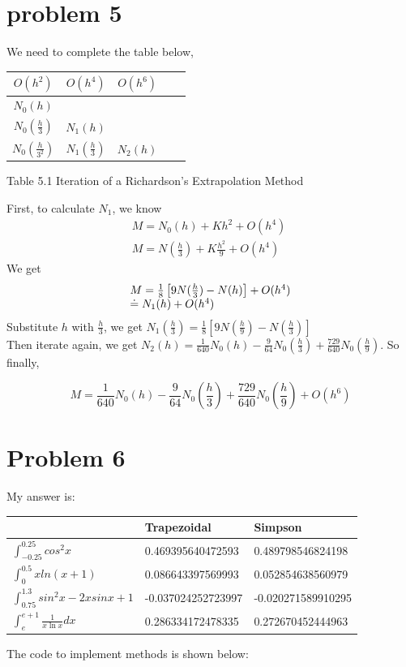 \documentclass{article}
\begin{document}
\section{problem 5}
We need to complete the table below,
\begin{center}
\begin{tabular}{ccccc} \hline
$O(h^2)$ & $O(h^4)$ &$O(h^6)$ \\
\hline
$N_0(h)$         		  &    								   & 										\\
$N_0(\frac{h}{3})$  & $N_1(h)$    				 &  									\\
$N_0(\frac{h}{3^2})$	& $N_1(\frac{h}{3})$   & $N_2(h)$  					\\
 \hline
\end{tabular}
\end{center}
\begin{center}
Table 5.1 Iteration of a Richardson's Extrapolation Method
\end{center}
First, to calculate $N_1$, we know
\begin{equation}
\begin{array}{c}
M = {N_0}(h) + K{h^2} + O({h^4})\;\\
M = N(\frac{h}{3}) + K\frac{{{h^2}}}{9} + O({h^4})
\end{array}
\end{equation}
We get
\[\begin{array}{l}
M = \frac{1}{8}\left[ {9N(\frac{h}{3}) - N(h)} \right] + O({h^4})\\
 \buildrel\textstyle.\over= {N_1}(h) + O({h^4})
\end{array}\]
Substitute $h$ with $\frac{h}{3}$, we get $N_1(\frac{h}{3})=\frac{1}{8}\left[ {9N(\frac{h}{9}) - N(\frac{h}{3})} \right]$
\\Then iterate again, we get
$N_2(h)=\frac{1}{{640}}{N_0}(h) - \frac{9}{{64}}{N_0}(\frac{h}{3}) + \frac{{729}}{{640}}{N_0}(\frac{h}{9})$. So finally,

\[M = \frac{1}{{640}}{N_0}(h) - \frac{9}{{64}}{N_0}(\frac{h}{3}) + \frac{{729}}{{640}}{N_0}(\frac{h}{9}) + O({h^6})\]


\section{Problem 6}
My answer is:
\begin{center}\begin{tabular}{l|ll}
\hline
 & Trapezoidal & Simpson \\
\hline
$\int_{-0.25}^{0.25}{cos^2x}$ &{0.469395640472593} & 0.489798546824198\\
$\int_{0}^{0.5}{xln(x+1)}$&{0.086643397569993}&0.052854638560979\\
$\int_0.75^1.3{sin^2x-2xsinx+1}$&{-0.037024252723997 }&-0.020271589910295\\
$\int_e^{e+1} {\frac{1}{{x\ln x}}dx} $&{0.286334172478335 }&0.272670452444963\\
\hline
\end{tabular}
\end{center}
The code to implement methods is shown below:


\end{document}
